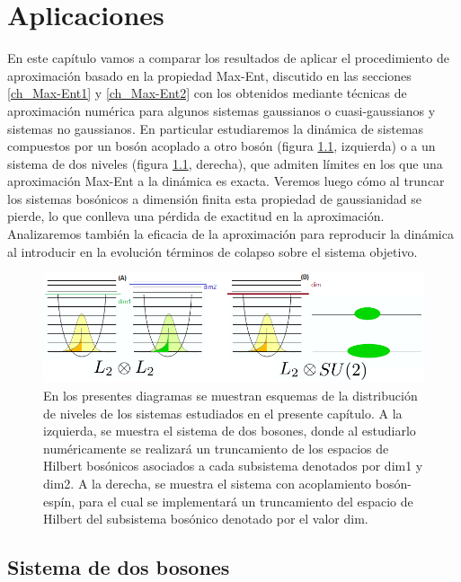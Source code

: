 \documentclass{report} %
\numberwithin{equation}{section}
\begin{document}
\chapter{Aplicaciones}
\label{chapter5}

En este capítulo vamos a comparar los resultados de aplicar el procedimiento de aproximación basado en la propiedad Max-Ent, discutido en las secciones
\ref{ch_Max-Ent1} y \ref{ch_Max-Ent2} con los obtenidos mediante t\'ecnicas de aproximación numérica para algunos sistemas gaussianos o cuasi-gaussianos y sistemas no gaussianos. En particular estudiaremos la dinámica de sistemas compuestos por un bosón acoplado a otro bosón (figura \ref{fig_models-cap5}, izquierda) o a un sistema de dos niveles (figura \ref{fig_models-cap5}, derecha), que admiten límites en los que una aproximación Max-Ent a la dinámica es exacta. Veremos luego cómo al truncar los sistemas bosónicos a dimensión finita esta propiedad de gaussianidad se pierde, lo que conlleva una pérdida de exactitud en la aproximación. Analizaremos también la eficacia de la aproximación para reproducir la dinámica al  introducir en la evolución términos de colapso sobre el sistema objetivo.

\begin{figure}
    \centering
    \includegraphics[scale=0.50]{figs/fig_models-cap5.png}
    \caption{En los presentes diagramas se muestran esquemas de la distribución de niveles de los sistemas estudiados en el presente capítulo. A la izquierda, se muestra el sistema de dos bosones, donde al estudiarlo numéricamente se realizará un truncamiento de los espacios de Hilbert bosónicos asociados a cada subsistema denotados por dim1 y dim2. A la derecha, se muestra el sistema con acoplamiento bosón-espín, para el cual se implementará un truncamiento del espacio de Hilbert del subsistema bosónico denotado por el valor dim.}
    \label{fig_models-cap5}
\end{figure}

\section{Sistema de dos bosones}
\end{document}
